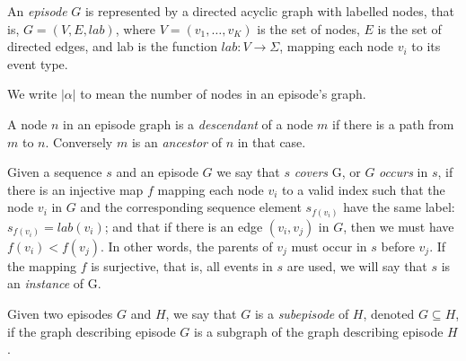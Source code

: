 \begin{definition}
An \emph{episode} $ G $ is represented by a directed acyclic graph with labelled nodes, that is, $ G = (V, E, lab) $, where $ V = (v_1, \ldots, v_K) $ is the set of nodes, $ E $ is the set of directed edges, and lab is the function $ lab \colon V \rightarrow \Sigma $, mapping each node $ v_i $ to its event type.
\end{definition}

We write $ | \alpha | $ to mean the number of nodes in an episode's graph.

\begin{definition}
A node $ n $ in an episode graph is a \emph{descendant} of a node $ m $ if there is a path from $ m $ to $ n $. Conversely $ m $ is an \emph{ancestor} of $ n $ in that case.
\end{definition}

\begin{definition}
Given a sequence $ s $ and an episode $ G $ we say that $ s $ \emph{covers} G, or $ G $ \emph{occurs} in $ s $, if there is an injective map $ f $ mapping each node $ v_i $ to a valid index such that the node $ v_i $ in $ G $ and the corresponding sequence element $ s_{f(v_i)} $ have the same label: $ s_{f(v_i)} = lab(v_i) $; and that if there is an edge $ (v_i, v_j) $ in $ G $, then we must have $ f(v_i) < f(v_j) $. In other words, the parents of $ v_j $ must occur in $ s $ before $ v_j $. If the mapping $ f $ is surjective, that is, all events in $ s $ are used, we will say that $ s $ is an \emph{instance} of G.
\end{definition}

\begin{definition}
Given two episodes $ G $ and $ H $, we say that $ G $ is a \emph{subepisode} of $ H $, denoted $ G \subseteq H $, if the graph describing episode $ G $ is a subgraph of the graph describing episode $ H $.
\end{definition}

